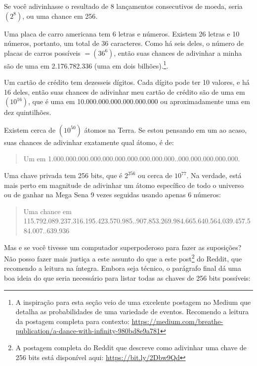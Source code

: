 
Se você adivinhasse o resultado de 8 lançamentos consecutivos de moeda, seria $(2^8)$, ou uma chance em 256.

Uma placa de carro americana tem 6 letras e números. Existem 26 letras e 10 números, portanto, um total de 36 caracteres. Como há seis deles, o número de placas de carros possíveis $= (36^6)$, então suas chances de adivinhar a minha são de uma em 2.176.782.336 (uma em dois bilhões).\footnote{A inspiração para esta seção veio de uma excelente postagem no Medium que detalha as probabilidades de uma variedade de eventos. Recomendo a leitura da postagem completa para contexto: \url{https://medium.com/breathe-publication/a-dance-with-infinity-980bd8e9a781}}.

Um cartão de crédito tem dezesseis dígitos. Cada dígito pode ter 10 valores, e há 16 deles, então suas chances de adivinhar meu cartão de crédito são de uma em $(10^{16})$, que é uma em 10.000.000.000.000.000.000 ou aproximadamente uma em dez quintilhões.

Existem cerca de $(10^{50})$ átomos na Terra. Se estou pensando em um ao acaso, suas chances de adivinhar exatamente qual átomo, é de:

\begin{quote}{Um em 1.000.000.000.000.000.000.000.000.000.000..000.000.000.000.000.}\end{quote}

Uma chave privada tem 256 bits, que é \(2^{256}\) ou cerca de \(10^{77}\). Na verdade, está mais perto em magnitude de adivinhar um átomo específico de todo o universo ou de ganhar na Mega Sena 9 vezes seguidas usando apenas 6 números:

\begin{quote}{Uma chance em 115.792.089.237.316.195.423.570.985..907.853.269.984.665.640.564.039.457.584.007..639.936}\end{quote}

Mas e se você tivesse um computador superpoderoso para fazer as suposições? Não posso fazer mais justiça a este assunto do que a este post\footnote{A postagem completa do Reddit que descreve como adivinhar uma chave de 256 bits está disponível aqui: \url{https://bit.ly/2Dbw9Qd}} do Reddit, que recomendo a leitura na íntegra. Embora seja técnico, o parágrafo final dá uma boa ideia do que seria necessário para listar todas as chaves de 256 bits possíveis:

